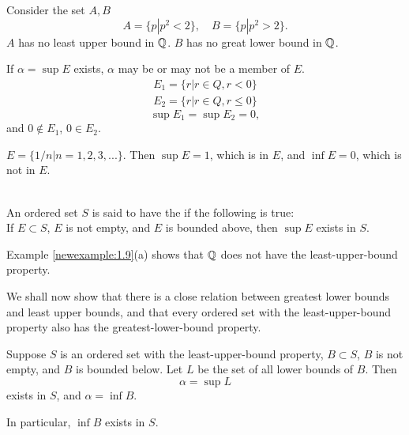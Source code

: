 \begin{newexample}
    \label{newexample:1.9}
    \begin{asparaenum}[(a)]
        \item Consider the set $A, B$
        \begin{equation*}
            A = \{p|p^2 < 2\},\quad
            B = \{p|p^2 > 2\}.
        \end{equation*}
        $A$ has no least upper bound in ${\protect\mathbb Q} $.
        $B$ has no great lower bound in ${\protect\mathbb Q} $.    
        \item If $\alpha = \sup E$ exists, $\alpha$ may be or may not be a member of $E$.
        \begin{align*}
            E_1 = \{r |r\in Q, r < 0\}\\
            E_2 = \{r |r\in Q, r \leq 0\}
        \end{align*}
        \begin{equation*}
            \sup E_1 = \sup E_2 = 0,
        \end{equation*}
        and $0\not\in E_1$, $0\in E_2$.
        \item $E = \{1/n | n = 1,2,3,...\}$. 
        Then $\sup E = 1$, which is in $E$, 
        and $\inf E = 0$, which is not in $E$.
    \end{asparaenum}
\end{newexample}

\begin{mydef}
    \label{mydef:1.10}
    {\color{red}{least-upper-bound property}}\\
    An ordered set $S$ is said to have the  
    if the following is true:\\
    If $E \subset S$, $E$ is not empty, and $E$ is bounded above, then $\sup E$ exists in $S$.
\end{mydef}

Example \ref{newexample:1.9}(a) shows that ${\protect\mathbb Q} $ does not have the least-upper-bound property.

We shall now show that 
there is a close relation between greatest lower bounds and least upper bounds, 
and that every ordered set with the least-upper-bound property 
also has the greatest-lower-bound property.


\begin{thm}
    \label{thm:1.11}
    Suppose $S$ is an ordered set with the least-upper-bound property,
    $B \subset S$, $B$ is not empty, and $B$ is bounded below. 
    Let $L$ be the set of all lower bounds of $B$. 
    Then
    \begin{equation*}
        \alpha = \sup L
    \end{equation*}
    exists in $S$, and $\alpha = \inf B$.

    In particular, $\inf B$ exists in $S$.
\end{thm}

